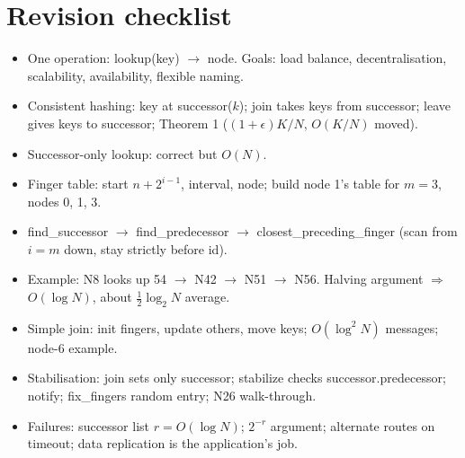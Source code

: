 \section{Revision checklist}
\begin{itemize}
  \item One operation: lookup(key) $\to$ node. Goals: load balance, decentralisation, scalability, availability, flexible naming.
  \item Consistent hashing: key at successor($k$); join takes keys from successor; leave gives keys to successor; Theorem 1 ($(1 + \epsilon)K/N$, $O(K/N)$ moved).
  \item Successor-only lookup: correct but $O(N)$.
  \item Finger table: start $n + 2^{i-1}$, interval, node; build node 1's table for $m=3$, nodes 0, 1, 3.
  \item find\_successor $\to$ find\_predecessor $\to$ closest\_preceding\_finger (scan from $i = m$ down, stay strictly before id).
  \item Example: N8 looks up 54 $\to$ N42 $\to$ N51 $\to$ N56. Halving argument $\Rightarrow$ $O(\log N)$, about $\frac{1}{2}\log_2 N$ average.
  \item Simple join: init fingers, update others, move keys; $O(\log^2 N)$ messages; node-6 example.
  \item Stabilisation: join sets only successor; stabilize checks successor.predecessor; notify; fix\_fingers random entry; N26 walk-through.
  \item Failures: successor list $r = O(\log N)$; $2^{-r}$ argument; alternate routes on timeout; data replication is the application's job.
\end{itemize}
